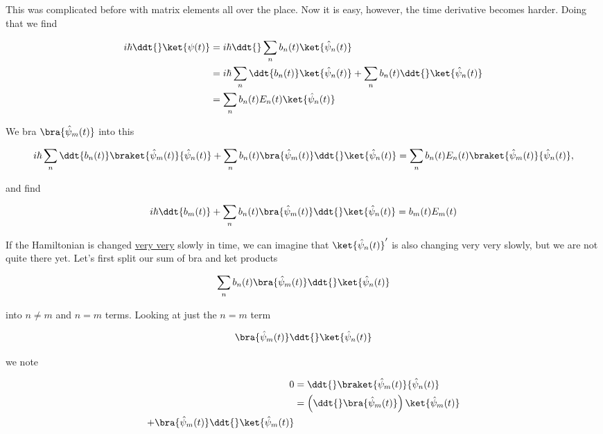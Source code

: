 This was complicated before with matrix elements all over the place.  Now it is easy, however, the time derivative becomes harder.  Doing that we find

\begin{align*}
i \hbar \ddt{} \ket{\psi(t)}
&=
i \hbar
\ddt{} \sum_n b_n(t) \ket{\hat{\psi}_n(t)} \\
&=
i \hbar
\sum_n 
\ddt{b_n(t)} \ket{\hat{\psi}_n(t)} 
+ \sum_n b_n(t) \ddt{} \ket{\hat{\psi}_n(t)} \\
&= \sum_n b_n(t) E_n(t) \ket{\hat{\psi}_n(t)} 
\end{align*}

We bra $\bra{\hat{\psi}_m(t)}$ into this

\begin{equation}\label{eqn:qmTwoL8:400}
i \hbar
\sum_n 
\ddt{b_n(t)} 
\braket{\hat{\psi}_m(t)}{\hat{\psi}_n(t)}
+ \sum_n b_n(t) 
\bra{\hat{\psi}_m(t)}
\ddt{} \ket{\hat{\psi}_n(t)} 
= \sum_n b_n(t) E_n(t) \braket{\hat{\psi}_m(t)}{\hat{\psi}_n(t)} ,
\end{equation}

and find

\begin{equation}\label{eqn:qmTwoL8:410}
i \hbar
\ddt{b_m(t)} 
+ 
\sum_n b_n(t) 
\bra{\hat{\psi}_m(t)}
\ddt{} \ket{\hat{\psi}_n(t)} 
= b_m(t) E_m(t) 
\end{equation}

If the Hamiltonian is changed \underline{very very} slowly in time, we can imagine that $\ket{\hat{\psi}_n(t)}'$ is also changing very very slowly, but we are not quite there yet.  Let's first split our sum of bra and ket products 

\begin{equation}\label{eqn:qmTwoL8:430}
\sum_n b_n(t) 
\bra{\hat{\psi}_m(t)}
\ddt{} \ket{\hat{\psi}_n(t)} 
\end{equation}

into $n \ne m$ and $n = m$ terms.  Looking at just the $n = m$ term 

\begin{equation}\label{eqn:qmTwoL8:450}
\bra{\hat{\psi}_m(t)}
\ddt{} \ket{\hat{\psi}_n(t)} 
\end{equation}

we note

\begin{align*}
0 
&=
\ddt{} \braket{\hat{\psi}_m(t)}{\hat{\psi}_n(t)} \\
&=
\left( \ddt{} \bra{\hat{\psi}_m(t)} \right) \ket{\hat{\psi}_m(t)} \\
+ \bra{\hat{\psi}_m(t)} \ddt{} \ket{\hat{\psi}_m(t)} \\
\end{align*}

